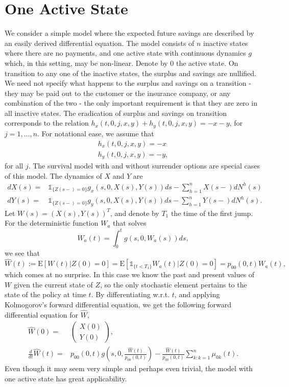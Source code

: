 \documentclass[12pt]{article}
\newcommand{\E}{\text{E}}
\newcommand{\indic}[1]{\mathds{1}_{ \{ #1 \} }}
\theoremstyle{my_thm}
\begin{document}
\section{One Active State}
We consider a simple model where the expected future savings are described by an easily derived differential equation. The model consists of $n$ inactive states where there are no payments, and one active state with continuous dynamics $g$ which, in this setting, may be non-linear. Denote by $0$ the active state. On transition to any one of the inactive states, the surplus and savings are nullified. We need not specify what happens to the surplus and savings on a transition - they may be paid out to the customer or the insurance company, or any combination of the two - the only important requirement is that they are zero in all inactive states. The eradication of surplus and savings on transition corresponds to the relation $h_x(t,0,j,x,y)+h_y(t,0,j,x,y)=-x-y$, for $j=1,...,n$. For notational ease, we assume that 
\begin{gather*}
h_x(t,0,j,x,y)=-x
\\
h_y(t,0,j,x,y)=-y,
\end{gather*}
for all $j$. The survival model with and without surrender options are special cases of this model.  The dynamics of $X$ and $Y$ are
\begin{align*}
dX(s)=& \indic{Z(s-)=0} g_x(s,0,X(s),Y(s))ds - \sum_{h=1}^n X(s-)dN^h(s)
\\
dY(s)=& \indic{Z(s-)=0} g_y(s,0,X(s),Y(s))ds - \sum_{h=1}^n Y(s-)dN^h(s).
\end{align*}
Let $W(s)=(X(s),Y(s))^T$, and denote by $T_1$ the time of the first jump. For the deterministic function $W_a$ that solves
$$
W_a(t)=\int_0^t g(s,0,W_a(s)) ds,
$$
we see that
$$
\hat{W}(t):=\E[W(t)|Z(0)=0] = \E [  \indic{t<T_1} W_a(t)|Z(0)=0]  = p_{00}(0,t) W_a(t),
$$
which comes at no surprise. In this case we know the past and present values of $W$ given the current state of $Z$, so the only stochastic element pertains to the state of the policy at time $t$. By differentiating w.r.t. $t$, and applying Kolmogorov's forward differential equation, we get the following forward differential equation for $\hat{W}$,
\begin{align*}
\hat{W}(0)=&\begin{pmatrix}
X(0)\\
Y(0)
\end{pmatrix},
\\
\frac{d}{dt}\hat{W}(t)=&p_{00}(0,t) g \left( s,0,\frac{\hat{W}(t)}{p_{00}(0,t)}\right)
-
\frac{\hat{W}(t)}{p_{00}(0,t)}\sum_{k:k=1}^n \mu_{0k}(t).
\end{align*}
Even though it may seem very simple and perhaps even trivial, the model with one active state has great applicability.
\end{document}
